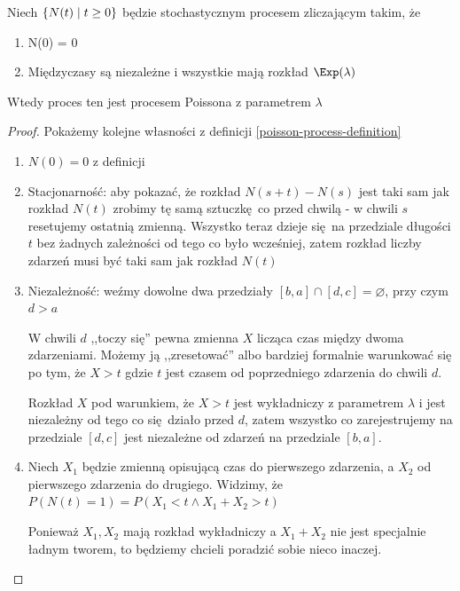 \begin{theorem}[Twierdzenie 8.11 P\&C]
	Niech \(\set{N(t) \mid t \geq 0}\) będzie stochastycznym procesem zliczającym takim, że
	\begin{enumerate}
		\item N(0) = 0
		\item Międzyczasy są niezależne i wszystkie mają rozkład \(\Exp(\lambda)\)
	\end{enumerate}
	Wtedy proces ten jest procesem Poissona z parametrem \( \lambda \)
\end{theorem}
\begin{proof}
	Pokażemy kolejne własności z definicji \ref{poisson-process-definition}

	\begin{enumerate}
		\item \( N(0) = 0 \) z definicji

		\item[2a.] Stacjonarność: aby pokazać, że rozkład \( N(s + t) - N(s) \) jest taki sam jak rozkład \( N(t) \) zrobimy tę samą sztuczkę co przed chwilą - w chwili \( s \) resetujemy ostatnią zmienną. Wszystko teraz dzieje się na przedziale długości \( t \) bez żadnych zależności od tego co było wcześniej, zatem rozkład liczby zdarzeń musi być taki sam jak rozkład \( N(t) \)

		\item[2b.] Niezależność: weźmy dowolne dwa przedziały \( [b, a] \cap [d, c] = \varnothing \), przy czym \( d > a \)

		      W chwili \( d \) ,,toczy się'' pewna zmienna \( X \) licząca czas między dwoma zdarzeniami.
		      Możemy ją ,,zresetować'' albo bardziej formalnie warunkować się po tym, że \( X > t \) gdzie \( t \) jest czasem od poprzedniego zdarzenia do chwili \( d \).

		      Rozkład \( X \) pod warunkiem, że \( X > t \) jest wykładniczy z parametrem \( \lambda \) i jest niezależny od tego co się działo przed \( d \), zatem wszystko co zarejestrujemy na przedziale \( [d, c] \) jest niezależne od zdarzeń na przedziale \( [b, a] \).

		      \setcounter{enumi}{2}
		\item Niech \( X_1 \) będzie zmienną opisującą czas do pierwszego zdarzenia, a \( X_2 \) od pierwszego zdarzenia do drugiego. Widzimy, że \( P(N(t) = 1) = P(X_1 < t \land X_1 + X_2 > t) \)

		      Ponieważ \( X_1, X_2 \) mają rozkład wykładniczy a \( X_1 + X_2 \) nie jest specjalnie ładnym tworem, to będziemy chcieli poradzić sobie nieco inaczej.


\end{enumerate}
\end{proof}
